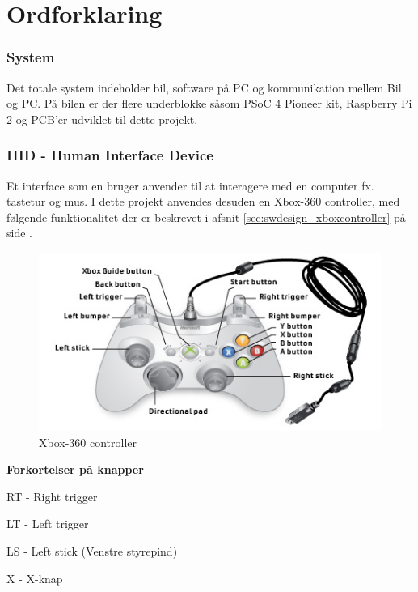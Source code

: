
\section{Ordforklaring} \label{sec:ordforklaring}

\subsubsection{System}
Det totale system indeholder bil, software på PC og kommunikation mellem Bil og PC. På bilen er der flere underblokke såsom PSoC 4 Pioneer kit, Raspberry Pi 2 og PCB'er udviklet til dette projekt.

\subsubsection{HID - Human Interface Device}
Et interface som en bruger anvender til at interagere med en computer fx. tastetur og mus. I dette projekt anvendes desuden en Xbox-360 controller, med følgende funktionalitet der er beskrevet i afsnit \ref{sec:swdesign_xboxcontroller}  på side \pageref{sec:swdesign_xboxcontroller}.

\begin{figure}[h]
	\centering
	\includegraphics[width=\textwidth*4/5]{../fig/billeder/Wired-controller-callouts.jpg}
	\caption{Xbox-360 controller \cite{lib:xboxcontroller}}
	\label{fig:xboxcontroller}
\end{figure}

\textbf{Forkortelser på knapper}
\begin{packed_item}
	\item RT - Right trigger
	\item LT - Left trigger 
	\item LS - Left stick (Venstre styrepind)
	\item X  - X-knap
\end{packed_item}

